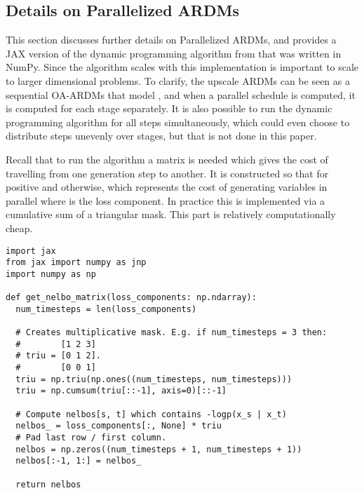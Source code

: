 \documentclass{article} \usepackage{iclr2022_conference,times}
\begin{document}
\newpage
\subsection{Details on Parallelized ARDMs}
This section discusses further details on Parallelized ARDMs, and provides a JAX version of the dynamic programming algorithm from \citep{watson2021learningefficientlysample} that was written in NumPy. Since the algorithm scales with  this implementation is important to scale to larger dimensional problems. To clarify, the upscale ARDMs can be seen as a  sequential OA-ARDMs that model , and when a parallel schedule is computed, it is computed for each stage separately. It is also possible to run the dynamic programming algorithm for all  steps simultaneously, which could even choose to distribute steps unevenly over stages, but that is not done in this paper. 



Recall that to run the algorithm a matrix  is needed which gives the cost of travelling from one generation step to another. It is constructed so that  for positive  and  otherwise, which represents the cost of generating  variables in parallel where  is the loss component. In practice this is implemented via a cumulative sum of a triangular mask. This part is relatively computationally cheap.
\begin{lstlisting}
import jax
from jax import numpy as jnp
import numpy as np

def get_nelbo_matrix(loss_components: np.ndarray):
  num_timesteps = len(loss_components)

  # Creates multiplicative mask. E.g. if num_timesteps = 3 then:
  #        [1 2 3]
  # triu = [0 1 2].
  #        [0 0 1]
  triu = np.triu(np.ones((num_timesteps, num_timesteps)))
  triu = np.cumsum(triu[::-1], axis=0)[::-1]

  # Compute nelbos[s, t] which contains -logp(x_s | x_t)
  nelbos_ = loss_components[:, None] * triu
  # Pad last row / first column.
  nelbos = np.zeros((num_timesteps + 1, num_timesteps + 1))
  nelbos[:-1, 1:] = nelbos_

  return nelbos
\end{lstlisting}
\end{document}
